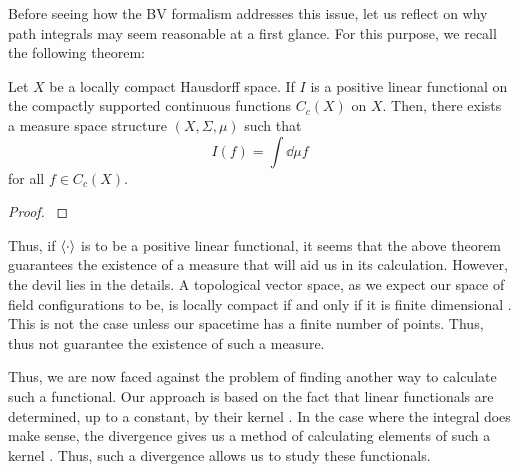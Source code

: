 Before seeing how the BV formalism addresses this issue, let us reflect on why path integrals may seem reasonable at a first glance. For this purpose, we recall the following theorem:
\begin{theorem}
Let $X$ be a locally compact Hausdorff space. If $I$ is a positive linear functional on the compactly supported continuous functions $C_c(X)$ on $X$. Then, there exists a measure space structure $(X,\Sigma,\mu)$ such that
\begin{equation}
I(f)=\int\dd\mu f
\end{equation}
for all $f\in C_c(X)$.
\end{theorem}  
\begin{proof}
\cite[see][Theorem 12.36]{Hewitt1975}
\end{proof}
Thus, if $\ev{\cdot}$ is to be a positive linear functional, it seems that the above theorem guarantees the existence of a measure that will aid us in its calculation. However, the devil lies in the details. A topological vector space, as we expect our space of field configurations to be, is locally compact if and only if it is finite dimensional \cite[see][Theorems 1.21 and 1.22]{Rudin1991}. This is not the case unless our spacetime has a finite number of points. Thus,  thus not guarantee the existence of such a measure. 

Thus, we are now faced against the problem of finding another way to calculate such a functional. Our approach is based on the fact that linear functionals are determined, up to a constant, by their kernel \cite[see][Proposition 1.1.1]{Kadison1997}. In the case where the integral does make sense, the divergence gives us a method of calculating elements of such a kernel \cite[see][equation $(*)$]{Karp1981}. Thus, such a divergence allows us to study these functionals.


